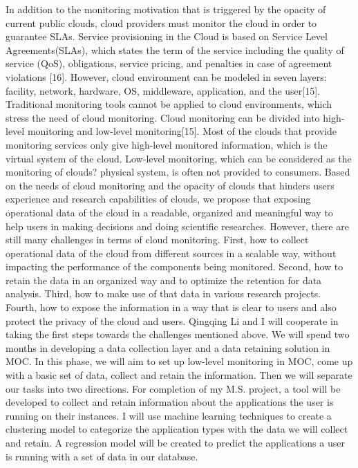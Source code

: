 In addition to the monitoring motivation that is triggered by the opacity of current public clouds, cloud providers must monitor the cloud in order to guarantee SLAs. Service provisioning in the Cloud is based on Service Level Agreements(SLAs), which states the term of the service including the quality of service (QoS), obligations, service pricing, and penalties in case of agreement violations [16]. However, cloud environment can be modeled in seven layers: facility, network, hardware, OS, middleware, application, and the user[15]. Traditional monitoring tools cannot be applied to cloud environments, which stress the need of cloud monitoring.
Cloud monitoring can be divided into high-level monitoring and low-level monitoring[15]. Most of the clouds that provide monitoring services only give high-level monitored information, which is the virtual system of the cloud. Low-level monitoring, which can be considered as the monitoring of clouds? physical system, is often not provided to consumers.
Based on the needs of cloud monitoring and the opacity of clouds that hinders users experience and research capabilities of clouds, we propose that exposing operational data of the cloud in a readable, organized and meaningful way to help users in making decisions and doing scientific researches. However, there are still many challenges in terms of cloud monitoring. First, how to collect operational data of the cloud from different sources in a scalable way, without impacting the performance of the components being monitored. Second, how to retain the data in an organized way and to optimize the retention for data analysis. Third, how to make use of that data in various research projects. Fourth, how to expose the information in a way that is clear to users and also protect the privacy of the cloud and users. 
Qingqing Li and I will cooperate in taking the first steps towards the challenges mentioned above. We will spend two months in developing a data collection layer and a data retaining solution in MOC. In this phase, we will aim to set up low-level monitoring in MOC, come up with a basic set of data, collect and retain the information. Then we will separate our tasks into two directions. For completion of my M.S. project, a tool will be developed to collect and retain information about the applications the user is running on their instances.  I will use machine learning techniques to create a clustering model to categorize the application types with the data we will collect and retain. A regression model will be created to predict the applications a user is running with a set of data in our database.
